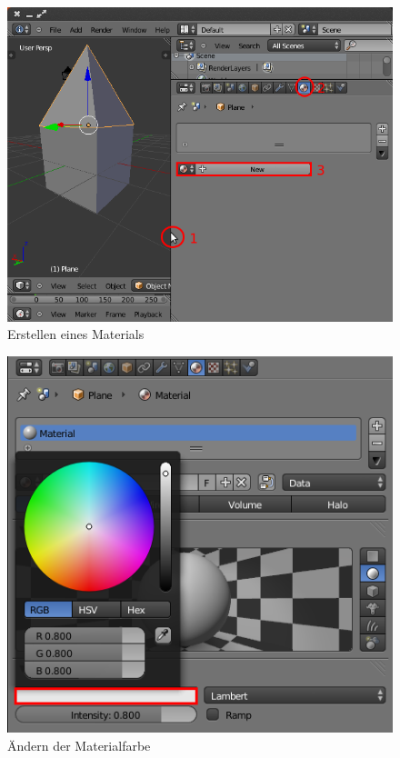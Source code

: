 \documentclass[10pt,a5paper,twoside,titlepage]{scrartcl}
\begin{document}
	\begin{figure}
	\centering
	\includegraphics[trim=0cm 0cm 0cm 0cm,clip=true,scale=.4]{blender_newmat.png}
	\caption{Erstellen eines Materials}
	\label{fig:blender_create_mat}
	\end{figure}
	\begin{figure}
	\centering
	\includegraphics[trim=0cm 0cm 0cm 0cm,clip=true,scale=.34]{blender_mat_col.png}
	\caption{Ändern der Materialfarbe}
	\label{fig:blender_mat_col}
	\end{figure}
	
\end{document}
